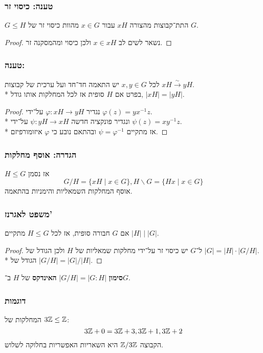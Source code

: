 \subsubsection{טענה: כיסוי זר}
$G \le H$ התת־קבוצות מהצורה $xH$ עבור $x \in G$ מהוות כיסוי זר של $G$.
\begin{proof}
	נשאר לשים לב $x \in xH$ ולכן כיסוי ומהמסקנה זר.
\end{proof}

\subsubsection{טענה: }
לכל $x, y \in G$ יש התאמה חד־חד ועל ערכית של קבוצות $xH \xrightarrow{\sim} yH$. \\*
בפרט אם $H$ סופית אז לכל המחלקות אותו גודל, $|xH| = |yH|$.
\begin{proof}
	נגדיר
	$\varphi : xH \to yH$ על־ידי $\varphi(z) = y x^{-1} z$. \\*
	ונגדיר פונקציה חדשה $\psi : yH \to xH$ על־ידי $\psi(z) = x y^{-1} z$. \\*
	אז מתקיים $\psi = \varphi^{-1}$ ובהתאם נובע כי $\varphi$ איזומורפיזם.
\end{proof}

\subsubsection{הגדרה: אוסף מחלקות}
$H \le G$ אז נסמן
\[
	G / H = \{ xH \mid x \in G \},
	H \backslash G = \{ Hx \mid x \in G \}
\]
אוסף המחלקות השמאליות והימניות בהתאמה.

\subsubsection{משפט לאגרנז'}
אם $G$ חבורה סופית, אז לכל $H \le G$ מתקיים $\left. |H| \mid |G| \right. $.
\begin{proof}
	ל־$G$ יש כיסוי זר על־ידי מחלקות שמאליות של $H$ ולכן הגודל של $|G| = |H| \cdot |G / H|$. \\*
	הגודל של $|G / H| = |G| / |H|$.
\end{proof}
\textbf{סימון}
$|G / H| = |G : H|$ \textbf{האינדקס} של $H$ ב־$G$.

\subsubsection{דוגמות}
המחלקות של $3\mathbb{Z} \le \mathbb{Z}$:
\[
	3\mathbb{Z} + 0 = 3\mathbb{Z} + 3, 3\mathbb{Z} + 1, 3\mathbb{Z} + 2
\]
הקבוצה $\mathbb{Z}/3\mathbb{Z}$ היא השאריות האפשריות בחלוקה לשלוש.


